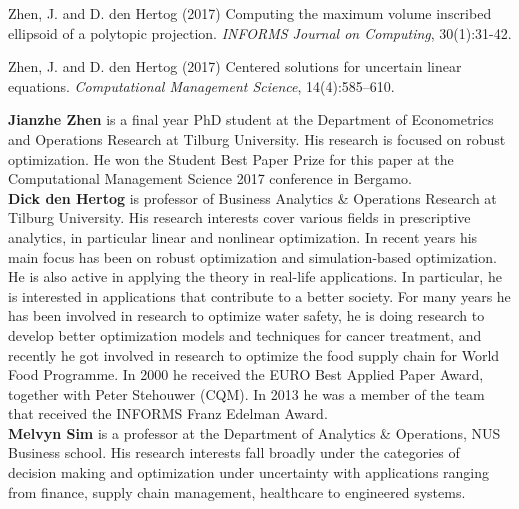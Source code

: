 \documentclass[fleqn,mnsc,blindrev]{informs4}
\begin{document}
\begin{thebibliography}{}
			Zhen, J. and D. den Hertog (2017)
			Computing the maximum volume inscribed ellipsoid of a polytopic projection. {\it INFORMS Journal on Computing}, 30(1):31-42.
			
			
			Zhen, J. and D. den Hertog (2017)
			Centered solutions for uncertain linear equations. {\it Computational Management Science}, 14(4):585--610.

		
			
		\end{thebibliography}
	

\newpage
		\textbf{Jianzhe Zhen} is a final year PhD student at the Department of Econometrics and Operations Research at Tilburg University. His research is focused on robust optimization. He won the Student Best Paper Prize for this paper at the Computational Management Science 2017 conference in Bergamo. \\
		
		\textbf{Dick den Hertog} is professor of Business Analytics \& Operations Research at Tilburg University.
		His research interests cover various fields in prescriptive analytics, in particular linear and nonlinear optimization. In recent years his main focus has been on robust optimization and simulation-based optimization. He is also active in applying the theory in real-life applications. In particular, he is interested in applications that contribute to a better society. For many years he has been involved in research to optimize water safety, he is doing research to develop better optimization models and techniques for cancer treatment, and recently he got involved in research to optimize the food supply chain for World Food Programme. In 2000 he received the EURO Best Applied Paper Award, together with Peter Stehouwer (CQM). In 2013 he was a member of the team that received the INFORMS Franz Edelman Award.\\
		
		\textbf{Melvyn Sim} is a professor at the Department of Analytics \& Operations, NUS Business school. His research interests fall broadly under the categories of decision making and optimization under uncertainty with applications ranging from finance, supply chain management, healthcare to engineered systems.
		
		
		
	
\end{document}
